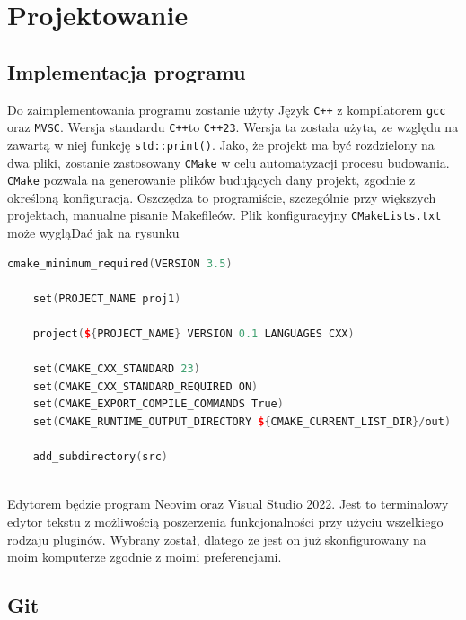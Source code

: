 	\newpage
\section{Projektowanie}		%

\subsection{Implementacja programu}


Do zaimplementowania programu zostanie użyty Język \texttt{C++} z kompilatorem \texttt{gcc} oraz \texttt{MVSC}. Wersja standardu \texttt{C++}to \texttt{C++23}. Wersja ta została użyta, ze względu na zawartą w niej funkcję \texttt{std::print()}. Jako, że projekt ma być rozdzielony na dwa pliki, zostanie zastosowany \texttt{CMake} w celu automatyzacji procesu budowania. \texttt{CMake} pozwala na generowanie plików budujących dany projekt, zgodnie z określoną konfiguracją. Oszczędza to programiście, szczególnie przy większych projektach, manualne pisanie Makefileów.
Plik konfiguracyjny \texttt{CMakeLists.txt} może wygląDać jak na rysunku

\begin{lstlisting}[caption=Plik konfiguracyjny CMake, label={lst:cmakelists}, language=C++]
	cmake_minimum_required(VERSION 3.5)
	
	set(PROJECT_NAME proj1)
	
	project(${PROJECT_NAME} VERSION 0.1 LANGUAGES CXX)
	
	set(CMAKE_CXX_STANDARD 23)
	set(CMAKE_CXX_STANDARD_REQUIRED ON)
	set(CMAKE_EXPORT_COMPILE_COMMANDS True)
	set(CMAKE_RUNTIME_OUTPUT_DIRECTORY ${CMAKE_CURRENT_LIST_DIR}/out)
	
	add_subdirectory(src)
	
\end{lstlisting}

Edytorem będzie program Neovim oraz Visual Studio 2022. Jest to terminalowy edytor tekstu z możliwością poszerzenia funkcjonalności przy użyciu wszelkiego rodzaju pluginów. Wybrany został, dlatego że jest on już skonfigurowany na moim komputerze zgodnie z moimi preferencjami.
\subsection{Git}

